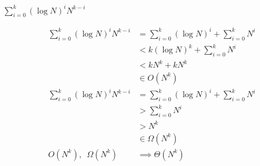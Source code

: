 \question $\displaystyle\sum_{i = 0}^{k} (\log N)^i N^{k-i}$
\begin{solution}[2in]
\begin{align*}
\sum_{i = 0}^{k} (\log N)^i N^{k-i}
&= \sum_{i = 0}^{k} (\log N)^i + \sum_{i = 0}^{k} N^i \\
&< k(\log N)^k + \sum_{i = 0}^{k} N^i \\
&< kN^k + kN^k \\
&\in O(N^k) \\
\sum_{i = 0}^{k} (\log N)^i N^{k-i}
&= \sum_{i = 0}^{k} (\log N)^i + \sum_{i = 0}^{k} N^i \\
&> \sum_{i = 0}^{k} N^i \\
&> N^k \\
&\in \Omega(N^k) \\
O(N^k), \enspace \Omega(N^k) &\implies \Theta(N^k)
\end{align*}
\end{solution}